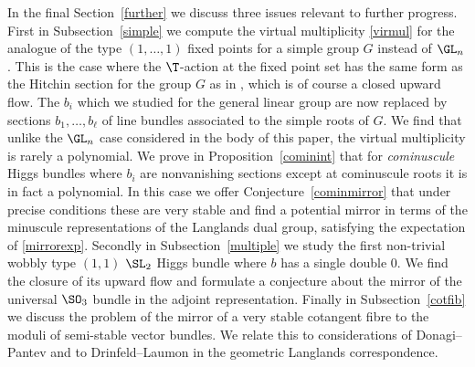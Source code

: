 In the final Section~\ref{further} we discuss three issues relevant to further progress. First in Subsection~\ref{simple} we compute the virtual multiplicity \eqref{virmul} for the analogue of  the type $(1,\dots,1)$ fixed points for a simple group $G$ instead of $\GL_n$. This is the case where the $\T$-action at the fixed point set has the same form as the Hitchin section for the group $G$ as in \cite{hitchin-lie}, which is of course a closed upward flow. The $b_i$ which we studied for the general linear group are now replaced by sections $b_1,\dots, b_{\ell}$ of line bundles associated to the simple roots of $G$.
We find that unlike  the $\GL_n$ case considered in the body of this paper, the virtual multiplicity is rarely a polynomial. We prove in Proposition~\ref{cominint} that for {\em cominuscule} Higgs bundles where $b_i$ are nonvanishing sections except at  cominuscule roots it is in fact a polynomial.  In this case we offer Conjecture~\ref{cominmirror} that under precise conditions these are very stable and find a potential mirror in terms of the minuscule representations of the Langlands dual group, satisfying the expectation of \eqref{mirrorexp}. Secondly in Subsection~\ref{multiple} we study the first non-trivial wobbly type $(1,1)$ $\SL_2$ Higgs bundle where $b$ has a single double $0$. We find the closure of its upward flow and formulate a conjecture about the mirror of the universal  $\SO_3$ bundle  in the adjoint representation. Finally in Subsection~\ref{cotfib} we discuss the problem of the mirror of a very stable cotangent fibre to the moduli of semi-stable vector bundles. We relate this to considerations of Donagi--Pantev and to Drinfeld--Laumon in the geometric Langlands correspondence.




